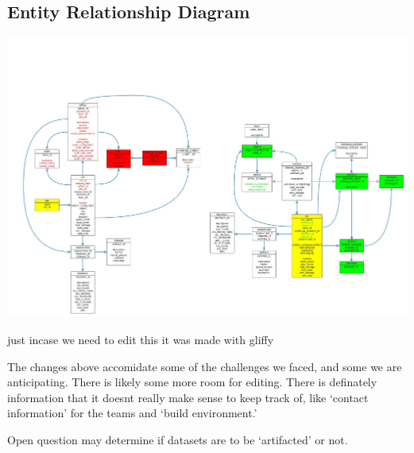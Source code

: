 \documentclass[11pt]{article} %
\begin{document}
  
  \newpage
\subsection*{Entity Relationship Diagram}
  \begin{center}
    \includegraphics[width=\textwidth]{erd_ppaml.jpg}
    
    {\footnotesize just incase we need to edit this it was made with gliffy}
  \end{center}

  The changes above accomidate some of the challenges we faced, and some we are anticipating. There is likely some more room for editing. There is definately information that it doesnt really make sense to keep track of, like `contact information' for the teams and `build environment.'

  Open question may determine if datasets are to be `artifacted' or not.
\newpage
\end{document}
